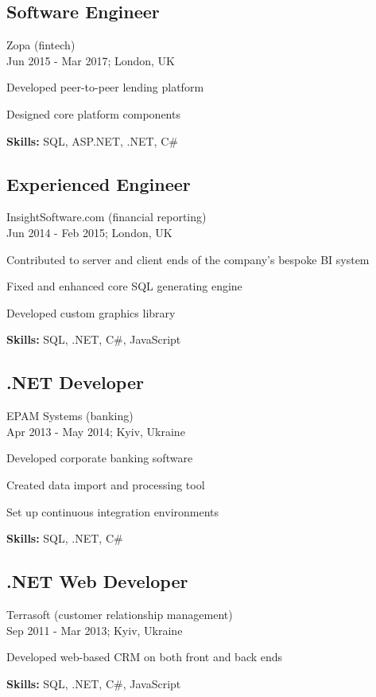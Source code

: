 \documentclass[a4paper,10pt]{article}
\begin{document}
\subsection*{Software Engineer}
Zopa (fintech) \\
Jun 2015 - Mar 2017; London, UK
\begin{bulletlist}
    \item Developed peer-to-peer lending platform
    \item Designed core platform components
\end{bulletlist}
\textbf{Skills:} SQL, ASP.NET, .NET, C\#

\subsection*{Experienced Engineer}
InsightSoftware.com (financial reporting) \\
Jun 2014 - Feb 2015; London, UK
\begin{bulletlist}
    \item Contributed to server and client ends of the company's bespoke BI system
    \item Fixed and enhanced core SQL generating engine
    \item Developed custom graphics library
\end{bulletlist}
\textbf{Skills:} SQL, .NET, C\#, JavaScript

\subsection*{.NET Developer}
EPAM Systems (banking) \\
Apr 2013 - May 2014; Kyiv, Ukraine
\begin{bulletlist}
    \item Developed corporate banking software
    \item Created data import and processing tool
    \item Set up continuous integration environments
\end{bulletlist}
\textbf{Skills:} SQL, .NET, C\#

\subsection*{.NET Web Developer}
Terrasoft (customer relationship management) \\
Sep 2011 - Mar 2013; Kyiv, Ukraine
\begin{bulletlist}
    \item Developed web-based CRM on both front and back ends
\end{bulletlist}
\textbf{Skills:} SQL, .NET, C\#, JavaScript
\end{document}
